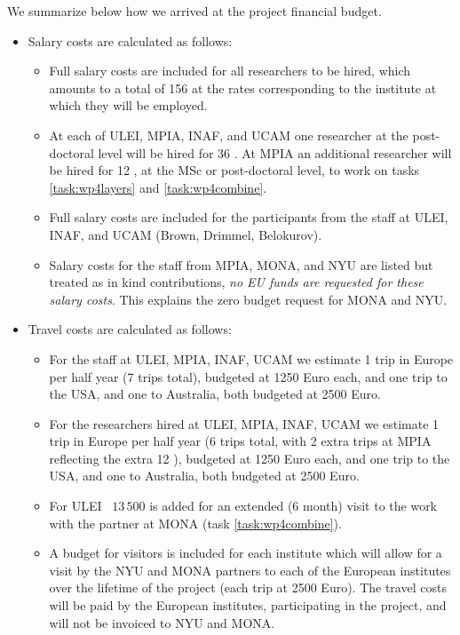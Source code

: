 We summarize below how we arrived at the project financial budget.
\begin{itemize}
    \item Salary costs are calculated as follows:
    \begin{itemize}
        \item Full salary costs are included for all researchers to be hired, which amounts to a total of 156 {\pems} at the rates corresponding to the institute at which they will be employed.
        \item At each of ULEI, MPIA, INAF, and UCAM one researcher at the post-doctoral level will be hired for 36 {\pems}. At MPIA an additional researcher will be hired for 12 {\pems}, at the MSc or post-doctoral level, to work on tasks \ref{task:wp4layers} and \ref{task:wp4combine}.
        \item Full salary costs are included for the participants from the staff at ULEI, INAF, and UCAM (Brown, Drimmel, Belokurov).
        \item Salary costs for the staff from MPIA, MONA, and NYU are listed but treated as in kind contributions, \emph{no EU funds are requested for these salary costs}. This explains the zero budget request for MONA and NYU.
    \end{itemize}
    \item Travel costs are calculated as follows:
    \begin{itemize}
        \item For the staff at ULEI, MPIA, INAF, UCAM we estimate 1 trip in Europe per half year (7 trips total), budgeted at 1250 Euro each, and one trip to the USA, and one to Australia, both budgeted at 2500 Euro.
        \item For the researchers hired at ULEI, MPIA, INAF, UCAM we estimate 1 trip in Europe per half year (6 trips total, with 2 extra trips at MPIA reflecting the extra 12 \pems), budgeted at 1250 Euro each, and one trip to the USA, and one to Australia, both budgeted at 2500 Euro.
        \item For ULEI \EUR~$13\,500$ is added for an extended (6 month) visit to the work with the partner at MONA (task \ref{task:wp4combine}).
        \item A budget for visitors is included for each institute which will allow for a visit by the NYU and MONA partners to each of the European institutes over the lifetime of the project (each trip at 2500 Euro). The travel costs will be paid by the European institutes, participating in the project, and will not be invoiced to NYU and MONA. 

\end{itemize}
\end{itemize}
